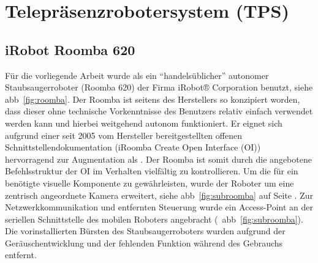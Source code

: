 \section{Telepräsenzrobotersystem (TPS)}
\label{section:tpsI}
\subsection{iRobot Roomba 620}
Für die vorliegende Arbeit wurde als \tp ein \enquote{handelsüblicher} autonomer Staubsaugerroboter (Roomba 620) der Firma iRobot® Corporation benutzt, siehe \acs{abb}~\ref{fig:roomba}. Der Roomba ist seitens des Herstellers so konzipiert worden, dass dieser ohne technische Vorkenntnisse des Benutzers relativ einfach verwendet werden kann und hierbei weitgehend autonom funktioniert. Er eignet sich aufgrund einer seit 2005 vom Hersteller bereitgestellten offenen Schnittstellendokumentation (iRoomba Create Open Interface (OI))~\cite{IRobot2010} hervorragend zur Augmentation als \tp. Der Roomba ist somit durch die angebotene Befehlsstruktur der OI im Verhalten vielfältig zu kontrollieren. Um die für ein \tp benötigte visuelle Komponente zu gewährleisten, wurde der Roboter um eine zentrisch angeordnete Kamera erweitert, siehe \acs{abb}~\ref{fig:subroomba} auf Seite \pageref{fig:subroomba}. Zur Netzwerkkommunikation und entfernten Steuerung wurde ein Access-Point an der seriellen Schnittstelle des mobilen Roboters angebracht (\vgl~\acs{abb}~\ref{fig:subroomba}). Die vorinstallierten Bürsten des Staubsaugerroboters wurden aufgrund der Geräuschentwicklung und der fehlenden Funktion während des Gebrauchs entfernt. 

